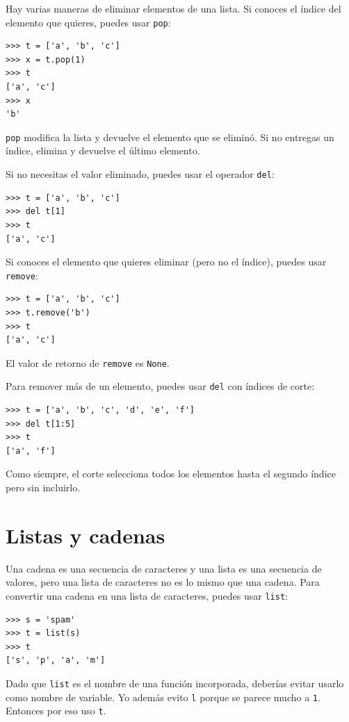 \documentclass[10pt]{book}
\begin{document}
Hay varias maneras de eliminar elementos de una lista.  Si conoces
el índice del elemento que quieres, puedes usar
{\tt pop}:

\begin{verbatim}
>>> t = ['a', 'b', 'c']
>>> x = t.pop(1)
>>> t
['a', 'c']
>>> x
'b'
\end{verbatim}
%
{\tt pop} modifica la lista y devuelve el elemento que se eliminó.
Si no entregas un índice, elimina y devuelve el
último elemento.

Si no necesitas el valor eliminado, puedes usar el
operador {\tt del}:

\begin{verbatim}
>>> t = ['a', 'b', 'c']
>>> del t[1]
>>> t
['a', 'c']
\end{verbatim}
%
Si conoces el elemento que quieres eliminar (pero no el índice),
puedes usar {\tt remove}:

\begin{verbatim}
>>> t = ['a', 'b', 'c']
>>> t.remove('b')
>>> t
['a', 'c']
\end{verbatim}
%
El valor de retorno de {\tt remove} es {\tt None}.

Para remover más de un elemento, puedes usar {\tt del} con
índices de corte:

\begin{verbatim}
>>> t = ['a', 'b', 'c', 'd', 'e', 'f']
>>> del t[1:5]
>>> t
['a', 'f']
\end{verbatim}
%
Como siempre, el corte selecciona todos los elementos hasta el segundo índice
pero sin incluirlo.



\section{Listas y cadenas}

Una cadena es una secuencia de caracteres y una lista es una secuencia
de valores, pero una lista de caracteres no es lo mismo que una
cadena.  Para convertir una cadena en una lista de caracteres,
puedes usar {\tt list}:

\begin{verbatim}
>>> s = 'spam'
>>> t = list(s)
>>> t
['s', 'p', 'a', 'm']
\end{verbatim}
%
Dado que {\tt list} es el nombre de una función incorporada, deberías
evitar usarlo como nombre de variable.  Yo además evito {\tt l} porque
se parece mucho a {\tt 1}.  Entonces por eso uso {\tt t}.
\end{document}
